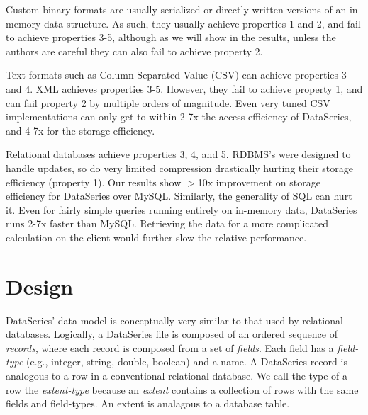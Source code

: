 \documentclass{acm_proc_article-sp}
\begin{document}
Custom binary formats are usually serialized or directly written
versions of an in-memory data structure.  As such, they usually
achieve properties 1 and 2, and fail to achieve properties 3-5,
although as we will show in the results, unless the authors are
careful they can also fail to achieve property 2.

Text formats such as Column Separated Value (CSV) can
achieve properties 3 and 4. XML achieves properties 3-5.  However,
they fail to achieve property 1, and can fail property 2 by multiple
orders of magnitude.  Even very tuned CSV
implementations can only get to within 2-7x the
access-efficiency of DataSeries, and 4-7x for the storage
efficiency.

Relational databases achieve properties 3, 4, and 5. RDBMS's were
designed to handle updates, so do very limited compression drastically
hurting their storage efficiency (property 1).  Our results show
$>$10x improvement on storage efficiency for DataSeries over
MySQL. 
Similarly, the generality of SQL can hurt it.  Even for fairly simple
queries running entirely on in-memory data, DataSeries runs 2-7x
faster than MySQL. 
Retrieving the data for a more complicated
calculation on the client would further slow the relative performance.

\section{Design}\label{sec:design}

DataSeries' data model is conceptually very similar to that used by
relational databases.  Logically, a DataSeries file is composed of an
ordered sequence of {\it records}, where each record is composed from
a set of {\it fields}. Each field has a {\it field-type} (e.g.,
integer, string, double, boolean) and a name. A DataSeries record is
analogous to a row in a conventional relational database. We call the
type of a row the {\it extent-type} because an {\it extent} contains a
collection of rows with the same fields and field-types. An extent is
analagous to a database table.
\end{document}
